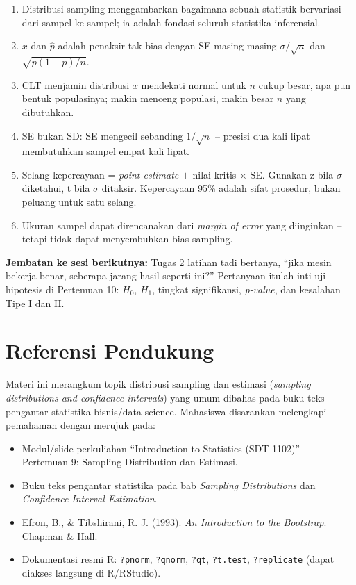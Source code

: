 \documentclass[
  indonesian,
  letterpaper,
]{book}
\providecommand{\tightlist}{%
  \setlength{\itemsep}{0pt}\setlength{\parskip}{0pt}}
\begin{document}
\begin{enumerate}
\def\labelenumi{\arabic{enumi}.}
\tightlist
\item
  Distribusi sampling menggambarkan bagaimana sebuah statistik
  bervariasi dari sampel ke sampel; ia adalah fondasi seluruh statistika
  inferensial.
\item
  \(\bar{x}\) dan \(\hat{p}\) adalah penaksir tak bias dengan SE
  masing-masing \(\sigma/\sqrt{n}\) dan \(\sqrt{p(1-p)/n}\).
\item
  CLT menjamin distribusi \(\bar{x}\) mendekati normal untuk \(n\) cukup
  besar, apa pun bentuk populasinya; makin menceng populasi, makin besar
  \(n\) yang dibutuhkan.
\item
  SE bukan SD: SE mengecil sebanding \(1/\sqrt{n}\) -- presisi dua kali
  lipat membutuhkan sampel empat kali lipat.
\item
  Selang kepercayaan = \emph{point estimate} \(\pm\) nilai kritis
  \(\times\) SE. Gunakan z bila \(\sigma\) diketahui, t bila \(\sigma\)
  ditaksir. Kepercayaan 95\% adalah sifat prosedur, bukan peluang untuk
  satu selang.
\item
  Ukuran sampel dapat direncanakan dari \emph{margin of error} yang
  diinginkan -- tetapi tidak dapat menyembuhkan bias sampling.
\end{enumerate}

\textbf{Jembatan ke sesi berikutnya:} Tugas 2 latihan tadi bertanya,
``jika mesin bekerja benar, seberapa jarang hasil seperti ini?''
Pertanyaan itulah inti uji hipotesis di Pertemuan 10: \(H_0\), \(H_1\),
tingkat signifikansi, \emph{p-value}, dan kesalahan Tipe I dan II.

\section{Referensi Pendukung}\label{referensi-pendukung}

Materi ini merangkum topik distribusi sampling dan estimasi
(\emph{sampling distributions and confidence intervals}) yang umum
dibahas pada buku teks pengantar statistika bisnis/data science.
Mahasiswa disarankan melengkapi pemahaman dengan merujuk pada:

\begin{itemize}
\tightlist
\item
  Modul/slide perkuliahan ``Introduction to Statistics (SDT-1102)'' --
  Pertemuan 9: Sampling Distribution dan Estimasi.
\item
  Buku teks pengantar statistika pada bab \emph{Sampling Distributions}
  dan \emph{Confidence Interval Estimation}.
\item
  Efron, B., \& Tibshirani, R. J. (1993). \emph{An Introduction to the
  Bootstrap}. Chapman \& Hall.
\item
  Dokumentasi resmi R: \texttt{?pnorm}, \texttt{?qnorm}, \texttt{?qt},
  \texttt{?t.test}, \texttt{?replicate} (dapat diakses langsung di
  R/RStudio).
\end{itemize}
\end{document}
